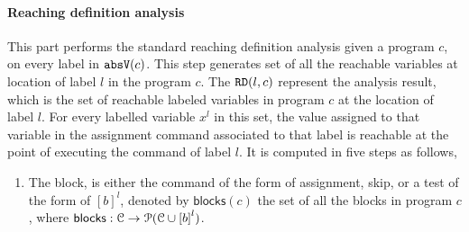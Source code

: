 \paragraph{Reaching definition analysis}
This part performs the standard reaching definition analysis given a program $c$, 
on 
every label in $\mathtt{abs}{\mathtt{V}}(c)$.  
This step generates set of all the reachable variables at location of label $l$ in the program $c$.
The $\mathtt{RD}(l, c)$ represent the analysis result, which is the set of 
reachable labeled variables in program $c$ at the location of label $l$.
For every labelled variable $x^l$ in this set, 
the value assigned to that variable
in the assignment command associated to that label is reachable at the point of  executing the command of label $l$.
It is computed in five steps as follows,
\begin{enumerate}
\item The block, 
is either the command of the form of assignment, skip, or a test of the form of $[b]^{l}$, 
denoted by $\mathsf{blocks}(c)$
the set of all the blocks 
in program $c$, where  $\mathsf{blocks}: \cdom \to \mathcal{P}(\cdom \cup \clabel{\bexpr}^{l})$.


\end{enumerate}
